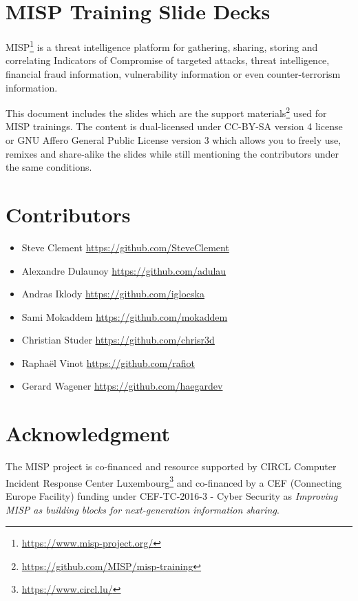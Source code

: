 \documentclass{article}
\begin{document}
\section*{MISP Training Slide Decks}

MISP\footnote{\url{https://www.misp-project.org/}} is a threat intelligence platform for gathering, sharing, storing and correlating Indicators of Compromise of targeted attacks, threat intelligence, financial fraud information, vulnerability information or even counter-terrorism information.

This document includes the slides which are the support materials\footnote{\url{https://github.com/MISP/misp-training}} used for MISP trainings. The content is dual-licensed under CC-BY-SA version 4 license or GNU Affero General Public License version 3 which allows you to freely use, remixes and share-alike the slides while still mentioning the contributors under the same conditions.

\section*{Contributors}

\begin{itemize}
\item Steve Clement \url{https://github.com/SteveClement}
\item Alexandre Dulaunoy \url{https://github.com/adulau}
\item Andras Iklody \url{https://github.com/iglocska}
\item Sami Mokaddem \url{https://github.com/mokaddem}
\item Christian Studer  \url{https://github.com/chrisr3d}
\item Raphaël Vinot \url{https://github.com/rafiot}
\item Gerard Wagener \url{https://github.com/haegardev}
\end{itemize}

\section*{Acknowledgment}

The MISP project is co-financed and resource supported by CIRCL Computer Incident Response Center Luxembourg\footnote{\url{https://www.circl.lu/}} and co-financed by a CEF (Connecting Europe Facility) funding under CEF-TC-2016-3 - Cyber Security as {\it Improving MISP as building blocks for next-generation information sharing}.
\end{document}
